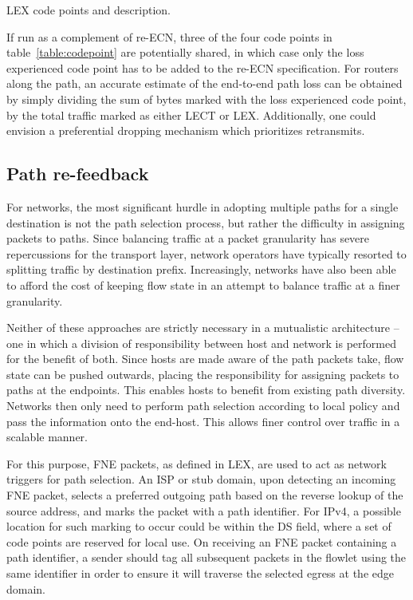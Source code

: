 \begin{table}
\footnotesize
\centering
{}
    
\caption{\acs{LEX} code points and description.}
\label{table:codepoint}
\end{table}

If run as a complement of re-\ac{ECN}, three of the four code points in table~\ref{table:codepoint} are potentially shared, in which case only the loss experienced code point has to be added to the re-\ac{ECN} specification. For routers along the path, an accurate estimate of the end-to-end path loss can be obtained by simply dividing the sum of bytes marked with the loss experienced code point, by the total traffic marked as either \ac{LECT} or \ac{LEX}. Additionally, one could envision a preferential dropping mechanism which prioritizes retransmits.

\subsection{Path re-feedback}

For networks, the most significant hurdle in adopting multiple paths for a single destination is not the path selection process, but rather the difficulty in assigning packets to paths. Since balancing traffic at a packet granularity has severe repercussions for the transport layer, network operators have typically resorted to splitting traffic by destination prefix. Increasingly, networks have also been able to afford the cost of keeping flow state in an attempt to balance traffic at a finer granularity. 

Neither of these approaches are strictly necessary in a mutualistic architecture -- one in which a division of responsibility between host and network is performed for the benefit of both.
Since hosts are made aware of the path packets take, flow state can be pushed outwards, placing the responsibility for assigning packets to paths at the endpoints. 
This enables hosts to benefit from existing path diversity.
Networks then only need to perform path selection according to local policy and pass the information onto the end-host.
This allows finer control over traffic in a scalable manner.

For this purpose, \ac{FNE} packets, as defined in \ac{LEX}, are used to act as network triggers for path selection. 
An \ac{ISP} or stub domain, upon detecting an incoming \ac{FNE} packet, selects a preferred outgoing path based on the reverse lookup of the source address, and marks the packet with a path identifier. 
For \ac{IPv4}, a possible location for such marking to occur could be within the \ac{DS} field, where a set of code points are reserved for local use. 
On receiving an \ac{FNE} packet containing a path identifier, a sender should tag all subsequent packets in the flowlet using the same identifier in order to ensure it will traverse the selected egress at the edge domain.

